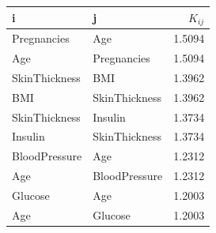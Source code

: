 \begin{tabular}{llr}
\toprule
i & j & $K_{ij}$ \\
\midrule
Pregnancies & Age & 1.5094 \\
Age & Pregnancies & 1.5094 \\
SkinThickness & BMI & 1.3962 \\
BMI & SkinThickness & 1.3962 \\
SkinThickness & Insulin & 1.3734 \\
Insulin & SkinThickness & 1.3734 \\
BloodPressure & Age & 1.2312 \\
Age & BloodPressure & 1.2312 \\
Glucose & Age & 1.2003 \\
Age & Glucose & 1.2003 \\
\bottomrule
\end{tabular}
